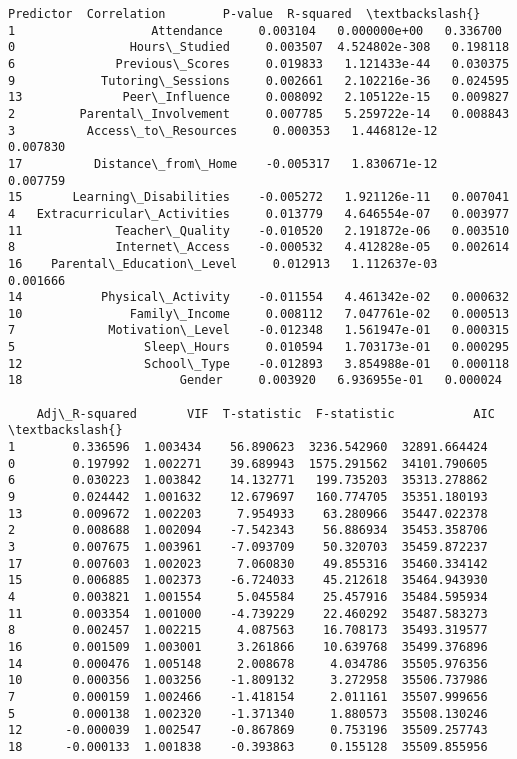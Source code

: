 \documentclass[11pt]{article}
\makeatletter
\newcommand{\boxspacing}{\kern\kvtcb@left@rule\kern\kvtcb@boxsep}
\newcommand{\prompt}[4]{
        {\ttfamily\llap{{\color{#2}[#3]:\hspace{3pt}#4}}\vspace{-\baselineskip}}
    }
\makeatother
\begin{document}
            \begin{tcolorbox}[breakable, size=fbox, boxrule=.5pt, pad at break*=1mm, opacityfill=0]
\prompt{Out}{outcolor}{114}{\boxspacing}
\begin{Verbatim}[commandchars=\\\{\}]
                     Predictor  Correlation        P-value  R-squared  \textbackslash{}
1                   Attendance     0.003104   0.000000e+00   0.336700
0                Hours\_Studied     0.003507  4.524802e-308   0.198118
6              Previous\_Scores     0.019833   1.121433e-44   0.030375
9            Tutoring\_Sessions     0.002661   2.102216e-36   0.024595
13              Peer\_Influence     0.008092   2.105122e-15   0.009827
2         Parental\_Involvement     0.007785   5.259722e-14   0.008843
3          Access\_to\_Resources     0.000353   1.446812e-12   0.007830
17          Distance\_from\_Home    -0.005317   1.830671e-12   0.007759
15       Learning\_Disabilities    -0.005272   1.921126e-11   0.007041
4   Extracurricular\_Activities     0.013779   4.646554e-07   0.003977
11             Teacher\_Quality    -0.010520   2.191872e-06   0.003510
8              Internet\_Access    -0.000532   4.412828e-05   0.002614
16    Parental\_Education\_Level     0.012913   1.112637e-03   0.001666
14           Physical\_Activity    -0.011554   4.461342e-02   0.000632
10               Family\_Income     0.008112   7.047761e-02   0.000513
7             Motivation\_Level    -0.012348   1.561947e-01   0.000315
5                  Sleep\_Hours     0.010594   1.703173e-01   0.000295
12                 School\_Type    -0.012893   3.854988e-01   0.000118
18                      Gender     0.003920   6.936955e-01   0.000024

    Adj\_R-squared       VIF  T-statistic  F-statistic           AIC  \textbackslash{}
1        0.336596  1.003434    56.890623  3236.542960  32891.664424
0        0.197992  1.002271    39.689943  1575.291562  34101.790605
6        0.030223  1.003842    14.132771   199.735203  35313.278862
9        0.024442  1.001632    12.679697   160.774705  35351.180193
13       0.009672  1.002203     7.954933    63.280966  35447.022378
2        0.008688  1.002094    -7.542343    56.886934  35453.358706
3        0.007675  1.003961    -7.093709    50.320703  35459.872237
17       0.007603  1.002023     7.060830    49.855316  35460.334142
15       0.006885  1.002373    -6.724033    45.212618  35464.943930
4        0.003821  1.001554     5.045584    25.457916  35484.595934
11       0.003354  1.001000    -4.739229    22.460292  35487.583273
8        0.002457  1.002215     4.087563    16.708173  35493.319577
16       0.001509  1.003001     3.261866    10.639768  35499.376896
14       0.000476  1.005148     2.008678     4.034786  35505.976356
10       0.000356  1.003256    -1.809132     3.272958  35506.737986
7        0.000159  1.002466    -1.418154     2.011161  35507.999656
5        0.000138  1.002320    -1.371340     1.880573  35508.130246
12      -0.000039  1.002547    -0.867869     0.753196  35509.257743
18      -0.000133  1.001838    -0.393863     0.155128  35509.855956


\end{Verbatim}
\end{tcolorbox}
\end{document}
